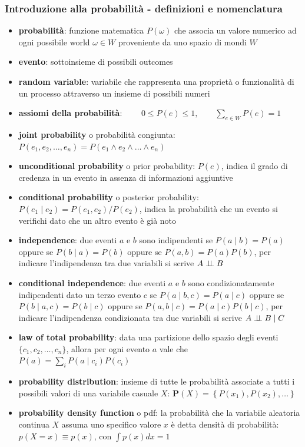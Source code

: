 \subsubsection*{Introduzione alla probabilità - definizioni e nomenclatura}
\begin{itemize}
	\item \textbf{probabilità}: funzione matematica \(P(\omega)\) che associa un valore numerico ad ogni possibile world
	\(\omega \in W\) proveniente da uno spazio di mondi \(W\)
	\item \textbf{evento}: sottoinsieme di possibili outcomes
	\item \textbf{random variable}: variabile che rappresenta una proprietà o funzionalità di un processo attraverso un
	insieme di possibili numeri
	\item \textbf{assiomi della probabilità}: \(\qquad 0 \leq P(e) \leq 1, \qquad \sum_{e \in W} P(e) = 1\)
	\item \textbf{joint probability} o probabilità congiunta: \(P(e_1, e_2, \ldots, e_n) = P(e_1 \land e_2 \land \dots \land e_n)\)
	\item \textbf{unconditional probability} o prior probability: \(P(e)\), indica il grado di credenza in un evento in assenza
	di informazioni aggiuntive
	\item \textbf{conditional probability} o posterior probability: \(P(e_1 \mid e_2) = P(e_1, e_2) / P(e_2)\), indica la probabilità
	che un evento si verifichi dato che un altro evento è già noto
	\item \textbf{independence}: due eventi \(a\) e \(b\) sono indipendenti se \(P(a \mid b) = P(a)\) oppure se \(P(b \mid a) = P(b)\)
	oppure se \(P(a, b) = P(a)P(b)\), per indicare l'indipendenza tra due variabili si scrive \(A \perp \!\!\! \perp B\)
	\item \textbf{conditional independence}: due eventi \(a\) e \(b\) sono condizionatamente indipendenti dato un terzo evento
	\(c\) se \(P(a \mid b, c) = P(a \mid c)\) oppure se \(P(b \mid a, c) = P(b \mid c)\) oppure se \(P(a, b \mid c) = P(a \mid c)P(b \mid c)\), per
	indicare l'indipendenza condizionata tra due variabili si scrive \(A \perp \!\!\! \perp B \mid C\)
	\item \textbf{law of total probability}: data una partizione dello spazio degli eventi \( \{c_1, c_2, \ldots, c_n\} \),
	allora per ogni evento \(a\) vale che \(P(a) = \sum_{i} P(a \mid c_i)P(c_i)\)
	\item \textbf{probability distribution}: insieme di tutte le probabilità associate a tutti i possibili valori di una
	variabile casuale \(X\): \(\textbf{P}(X) = \left\{ P(x_1), P(x_2), \dots \right\}\)
	\item \textbf{probability density function} o pdf: la probabilità che la variabile aleatoria continua \(X\) assuma uno
	specifico valore \(x\) è detta densità di probabilità: \(p(X = x) \equiv p(x)\), con \(\int p(x) dx = 1\)
\end{itemize}

